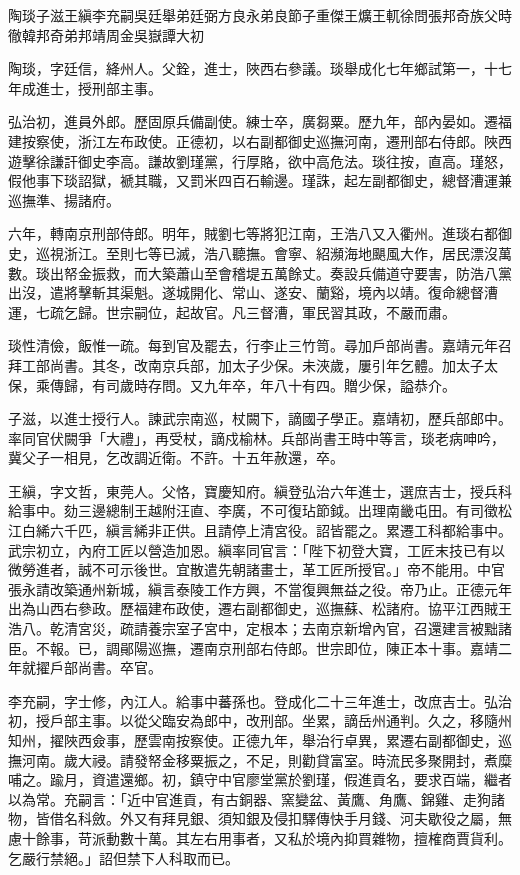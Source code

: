 
\begin{pinyinscope}
陶琰子滋王縝李充嗣吳廷舉弟廷弼方良永弟良節子重傑王爌王軏徐問張邦奇族父時徹韓邦奇弟邦靖周金吳嶽譚大初

陶琰，字廷信，絳州人。父銓，進士，陜西右參議。琰舉成化七年鄉試第一，十七年成進士，授刑部主事。

弘治初，進員外郎。歷固原兵備副使。練士卒，廣芻粟。歷九年，部內晏如。遷福建按察使，浙江左布政使。正德初，以右副都御史巡撫河南，遷刑部右侍郎。陜西遊擊徐謙訐御史李高。謙故劉瑾黨，行厚賂，欲中高危法。琰往按，直高。瑾怒，假他事下琰詔獄，褫其職，又罰米四百石輸邊。瑾誅，起左副都御史，總督漕運兼巡撫準、揚諸府。

六年，轉南京刑部侍郎。明年，賊劉七等將犯江南，王浩八又入衢州。進琰右都御史，巡視浙江。至則七等已滅，浩八聽撫。會寧、紹瀕海地颶風大作，居民漂沒萬數。琰出帑金振救，而大築蕭山至會稽堤五萬餘丈。奏設兵備道守要害，防浩八黨出沒，遣將擊斬其渠魁。遂城開化、常山、遂安、蘭谿，境內以靖。復命總督漕運，七疏乞歸。世宗嗣位，起故官。凡三督漕，軍民習其政，不嚴而肅。

琰性清儉，飯惟一疏。每到官及罷去，行李止三竹笥。尋加戶部尚書。嘉靖元年召拜工部尚書。其冬，改南京兵部，加太子少保。未浹歲，屢引年乞體。加太子太保，乘傳歸，有司歲時存問。又九年卒，年八十有四。贈少保，謚恭介。

子滋，以進士授行人。諫武宗南巡，杖闕下，謫國子學正。嘉靖初，歷兵部郎中。率同官伏闕爭「大禮」，再受杖，謫戍榆林。兵部尚書王時中等言，琰老病呻吟，冀父子一相見，乞改調近衛。不許。十五年赦還，卒。

王縝，字文哲，東莞人。父恪，寶慶知府。縝登弘治六年進士，選庶吉士，授兵科給事中。劾三邊總制王越附汪直、李廣，不可復玷節鉞。出理南畿屯田。有司徵松江白絺六千匹，縝言絺非正供。且請停上清宮役。詔皆罷之。累遷工科都給事中。武宗初立，內府工匠以營造加恩。縝率同官言：「陛下初登大寶，工匠末技已有以微勞進者，誠不可示後世。宜散遣先朝諸畫士，革工匠所授官。」帝不能用。中官張永請改築通州新城，縝言泰陵工作方興，不當復興無益之役。帝乃止。正德元年出為山西右參政。歷福建布政使，遷右副都御史，巡撫蘇、松諸府。協平江西賊王浩八。乾清宮災，疏請養宗室子宮中，定根本；去南京新增內官，召還建言被黜諸臣。不報。已，調鄖陽巡撫，遷南京刑部右侍郎。世宗即位，陳正本十事。嘉靖二年就擢戶部尚書。卒官。

李充嗣，字士修，內江人。給事中蕃孫也。登成化二十三年進士，改庶吉士。弘治初，授戶部主事。以從父臨安為郎中，改刑部。坐累，謫岳州通判。久之，移隨州知州，擢陜西僉事，歷雲南按察使。正德九年，舉治行卓異，累遷右副都御史，巡撫河南。歲大祲。請發帑金移粟振之，不足，則勸貸富室。時流民多聚開封，煮糜哺之。踰月，資遣還鄉。初，鎮守中官廖堂黨於劉瑾，假進貢名，要求百端，繼者以為常。充嗣言：「近中官進貢，有古銅器、窯變盆、黃鷹、角鷹、錦雞、走狗諸物，皆借名科斂。外又有拜見銀、須知銀及侵扣驛傳快手月錢、河夫歇役之屬，無慮十餘事，苛派動數十萬。其左右用事者，又私於境內抑買雜物，擅榷商賈貨利。乞嚴行禁絕。」詔但禁下人科取而已。


\end{pinyinscope}
